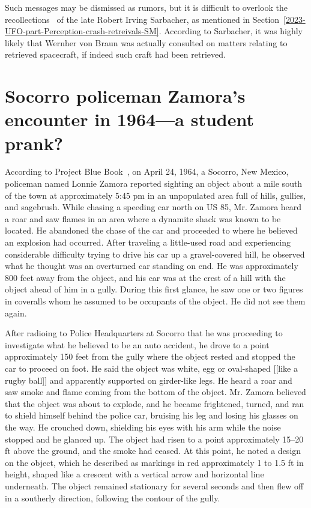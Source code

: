 Such messages may be dismissed as rumors, but it is difficult to overlook the recollections~\cite{SmithWilbertNotes} of the late Robert Irving Sarbacher,
as mentioned in Section~\ref{2023-UFO-part-Perception-crash-retreivals-SM}.
According to Sarbacher, it was highly likely that Wernher von Braun was actually consulted
on matters relating to retrieved spacecraft, if indeed such craft had been retrieved.


\section{Socorro policeman Zamora's encounter in 1964---a student prank?}

\label{2023-UFO-chapter-History--1953-2016-SZ64}

According to Project Blue Book~\cite[1964-04-8694587-Socorro-NewMexico]{bluebook-directory-listing}, on April 24, 1964, a Socorro, New Mexico, policeman named Lonnie Zamora reported sighting an object about a mile south of the town at approximately 5:45 pm in an unpopulated area full of hills, gullies, and sagebrush. While chasing a speeding car north on US 85, Mr. Zamora heard a roar and saw flames in an area where a dynamite shack was known to be located. He abandoned the chase of the car and proceeded to where he believed an explosion had occurred. After traveling a little-used road and experiencing considerable difficulty trying to drive his car up a gravel-covered hill, he observed what he thought was an overturned car standing on end. He was approximately 800 feet away from the object, and his car was at the crest of a hill with the object ahead of him in a gully. During this first glance, he saw one or two figures in coveralls whom he assumed to be occupants of the object. He did not see them again.

After radioing to Police Headquarters at Socorro that he was proceeding to investigate what he believed to be an auto accident, he drove to a point approximately 150 feet from the gully where the object rested and stopped the car to proceed on foot. He said the object was white, egg or oval-shaped [[like a rugby ball]] and apparently supported on girder-like legs. He heard a roar and saw smoke and flame coming from the bottom of the object. Mr. Zamora believed that the object was about to explode, and he became frightened, turned, and ran to shield himself behind the police car, bruising his leg and losing his glasses on the way. He crouched down, shielding his eyes with his arm while the noise stopped and he glanced up. The object had risen to a point approximately 15--20 ft above the ground, and the smoke had ceased. At this point, he noted a design on the object, which he described as markings in red approximately 1 to 1.5 ft in height, shaped like a crescent with a vertical arrow and horizontal line underneath. The object remained stationary for several seconds and then flew off in a southerly direction, following the contour of the gully.

